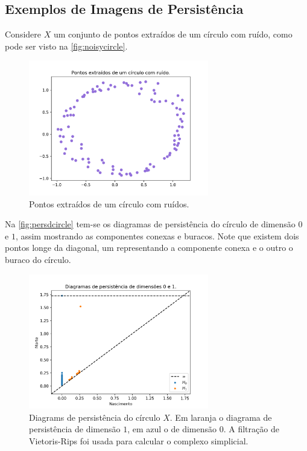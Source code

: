 \subsection{Exemplos de Imagens de Persistência}
Considere $X$ um conjunto de pontos extraídos de um círculo com ruído, como pode ser visto na 
\autoref{fig:noisycircle}.
\begin{figure}[!htbp]
    \centering
    \includegraphics[width=0.7\textwidth]{images/noisy_circle.png}
    \caption{Pontos extraídos de um círculo com ruídos.}
    \label{fig:noisycircle}
    \fautor
\end{figure}
Na \autoref{fig:persdcircle} tem-se os diagramas de persistência do círculo de dimensão $0$ e $1$, assim mostrando
as componentes conexas e buracos. Note que existem dois pontos longe da diagonal, um representando a 
componente conexa e o outro o buraco do círculo.  
\begin{figure}[!htbp]
    \centering
    \includegraphics[width=0.7\textwidth]{images/persdcircle.png}
    \caption{Diagrams de persistência do círculo $X$. Em laranja o diagrama de persistência de dimensão $1$,  
            em azul o de dimensão $0$. A filtração de Vietoris-Rips foi usada para calcular o complexo simplicial.}
    \label{fig:persdcircle}
    \fautor
\end{figure}
